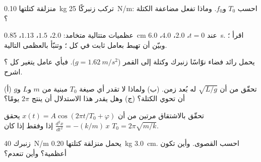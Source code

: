 \begin{exercise}[$\star$]\label{exo:g12:oscillators-and-time:3}
منزلقة كتلتها \qty{0.10}{kg} تركب زنبركًا  \qty{25}{N/m}: احسب $T_0$
و$f_0$. وماذا تفعل مضاعفة الكتلة ؟
\end{exercise}

\begin{exercise}[$\star$]\label{exo:g12:oscillators-and-time:4}
عظميات متتالية  متخامد: $2.0$، $1.5$، $1.13$،
\qty{0.85}{cm} عند $t = 0$، $2.0$، $4.0$، \qty{6.0}{s}. اقرأ
؛ وبيّن أن  تهبط بعامل ثابت في كل
؛ وتنبّأ بالعظمى التالية.
\end{exercise}

\begin{exercise}[$\star$]\label{exo:g12:oscillators-and-time:5}
يحمل رائد فضاء نوّاسًا  زنبرك وكتلة إلى
القمر ($g = \qty{1.62}{m/s^2}$). فبأي عامل يتغير كل ؟
اشرح.
\end{exercise}

\begin{exercise}[$\star\star$]\label{exo:g12:oscillators-and-time:6}
(أ) تحقّق من أن $\sqrt{L/g}$ له بُعد زمن. (ب) ولماذا لا تقدر
أي صيغة  $T_0$ مبنية من $m$ و$L$ و$g$ أن تحوي الكتلة؟
(ج) وهل يقدر هذا الاستدلال أن ينتج $2\pi$ يومًا؟
\end{exercise}

\begin{exercise}[$\star\star$]\label{exo:g12:oscillators-and-time:7}
تحقّق بالاشتقاق مرتين من أن $x(t) = A\cos(2\pi t/T_0 +
\varphi)$ يحقق $\frac{d^2x}{dt^2} = -(k/m)\,x$ إذا وفقط إذا كان
$T_0 = 2\pi\sqrt{m/k}$.
\end{exercise}

\begin{exercise}[$\star\star$]\label{exo:g12:oscillators-and-time:8}
زنبرك  \qty{40}{N/m} يحمل منزلقة كتلتها \qty{0.20}{kg}
 \qty{3.0}{cm}. احسب  
القصوى. وأين تكون  أعظمية؟ وأين تنعدم؟
\end{exercise}

